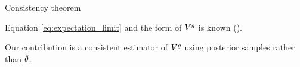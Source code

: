 \begin{frame}[t]{Consistency theorem}

Equation \ref{eq:expectation_limit} and the form of  $V^g$ is known (\citep{kleijn:2012:bvm}).  

Our contribution is a consistent estimator of $V^g$ using posterior samples 
rather than $\hat\theta$.

\end{frame}